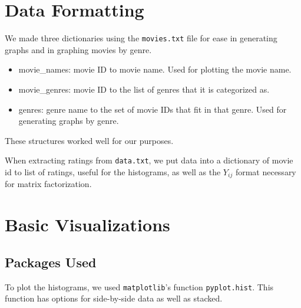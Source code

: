\newif\ifshowsolutions
\showsolutionsfalse


\usepackage{listings}
\usepackage{caption}

\captionsetup{margin=0.5in}
\captionsetup{labelfont=bf}

\newcommand{\boldline}[1]{\underline{\textbf{#1}}}
\newcommand{\plotteddata}[3]{
  \begin{figure}[h!]
  \caption{#1}
  \centering
  \texttt{[image: \#2]}
  \end{figure}
}





\pagestyle{fancy}



\section{Data Formatting}
We made three dictionaries using the {\tt movies.txt} file for ease in generating graphs and in graphing movies by genre.  
\begin{itemize}
    \item movie_names: movie ID to movie name. Used for plotting the movie name.
    \item movie_genres: movie ID to the list of genres that it is categorized as.
    \item genres: genre name to the set of movie IDs that fit in that genre. Used for generating graphs by genre.
\end{itemize}
These structures worked well for our purposes.

When extracting ratings from {\tt data.txt}, we put data into a dictionary of movie id to list of ratings, useful for the histograms, as well as the $Y_{ij}$ format necessary for matrix factorization.


\section{Basic Visualizations}

\subsection{Packages Used}
To plot the histograms, we used {\tt matplotlib}'s function {\tt pyplot.hist}.  This function has options for side-by-side data as well as stacked.

